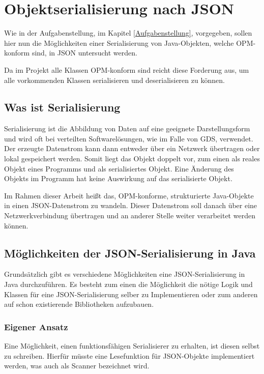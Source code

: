 \section{Objektserialisierung nach JSON}
Wie in der Aufgabenstellung, im Kapitel \ref{Aufgabenstellung}, vorgegeben, sollen hier nun die M\"oglichkeiten einer Serialisierung von Java-Objekten, welche \ac{OPM}-konform sind, in \ac{JSON} untersucht werden.

Da im Projekt alle Klassen \ac{OPM}-konform sind reicht diese Forderung aus, um alle vorkommenden Klassen serialisieren und deserialisieren zu k\"onnen.

\subsection{Was ist Serialisierung}
Serialisierung ist die Abbildung von Daten auf eine geeignete Darstellungsform und wird oft bei verteilten Softwarel\"osungen, wie im Falle von \ac{GDS}, verwendet. Der erzeugte Datenstrom kann dann entweder \"uber ein Netzwerk \"ubertragen oder lokal gespeichert werden. Somit liegt das Objekt doppelt vor, zum einen als reales Objekt eines Programms und als serialisiertes Objekt. Eine \"Anderung des Objekts im Programm hat keine Auswirkung auf das serialisierte Objekt. \cite{WikiSeri}

Im Rahmen dieser Arbeit hei\ss{}t das, \ac{OPM}-konforme, strukturierte Java-Objekte in einen \ac{JSON}-Datenstrom zu wandeln. Dieser Datenstrom soll danach \"uber eine Netzwerkverbindung \"ubertragen und an anderer Stelle weiter verarbeitet werden k\"onnen.

\subsection{M\"oglichkeiten der JSON-Serialisierung in Java}
Grunds\"atzlich gibt es verschiedene M\"oglichkeiten eine \ac{JSON}-Serialisierung in Java 
durchzuf\"uhren. Es besteht zum einen die M\"oglichkeit die n\"otige Logik und Klassen f\"ur eine \ac{JSON}-Serialisierung selber zu Implementieren oder zum anderen auf schon existierende Bibliotheken aufzubauen.


\subsubsection{Eigener Ansatz}
Eine M\"oglichkeit, einen funktionsf\"ahigen Serialisierer zu erhalten, ist diesen selbst zu schreiben. Hierf\"ur m\"usste eine Lesefunktion f\"ur \ac{JSON}-Objekte implementiert werden, was auch als Scanner bezeichnet wird. 

